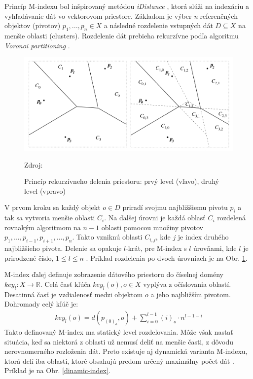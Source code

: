 \documentclass[12pt,a4paper,oneside]{fithesis2}
\begin{document}
Princíp M-indexu bol inšpirovaný metódou \textit{iDistance} \cite{iDistance}, ktorá slúži na indexáciu a vyhľadávanie dát vo vektorovom priestore. Základom je výber \textit{n} referenčných objektov (pivotov) $ p_1,...,p_n \in X $ a následné rozdelenie vstupných dát $ D \subseteq X $ na menšie oblasti (clusters). Rozdelenie dát prebieha rekurzívne podľa algoritmu \textit{Voronoi partitioning} \cite{voronoi, m-index}.

\begin{figure}[h!]
  		\centering
  		\includegraphics[width=\textwidth]{obr/m-index.png}
  		\caption{Princíp rekurzívneho delenia priestoru: prvý level (vľavo), druhý level (vpravo) } Zdroj: \cite{m-index} 
  		\label{m-index}
\end{figure}

V prvom kroku sa každý objekt $ o \in D $ priradí svojmu najbližšiemu pivotu $ p_i $ a tak sa vytvoria menšie oblasti $ C_i $. Na ďalšej úrovni je každá oblasť $ C_i $ rozdelená rovnakým algoritmom na $ n-1 $ oblasti pomocou množiny pivotov $ p_1,...,p_{i-1},p_{i+1},...,p_{n} $. Takto vzniknú oblasti $ C_{i,j} $, kde $ j $ je index druhého najbližšieho pivota. Delenie sa opakuje $ l$-krát, pre M-index s $ l $ úrovňami, kde $ l $ je prirodzené číslo, $ 1 \leq l \leq n $ \cite{m-index}. Príklad rozdelenia po dvoch úrovniach je na Obr. \ref{m-index}.  

M-index ďalej definuje zobrazenie dátového priestoru do číselnej domény $ key_l : X \rightarrow \mathbb{R} $. Celá časť kľúča $ key_l(o), o \in X $ vyplýva z očíslovania oblastí. %
Desatinná časť je vzdialenosť medzi objektom $o$ a jeho najbližším pivotom. Dohromady celý kľúč je:
\begin{align*}
key_l(o) = d(p_{(0)_o} , o) + \sum_{i=0}^{l-1}{(i)_o \cdot n^{l-1-i}} 
\end{align*}
Takto definovaný M-index ma statický level rozdeľovania. Môže však nastať situácia, keď sa niektorá z oblasti už nemusí deliť na menšie časti, z dôvodu nerovnomerného rozloženia dát. Preto existuje aj dynamická varianta M-indexu, ktorá delí iba oblasti, ktoré obsahujú predom určený maximálny počet dát \cite{m-index}. Príklad je na Obr. \ref{dinamic-index}.
\end{document}
